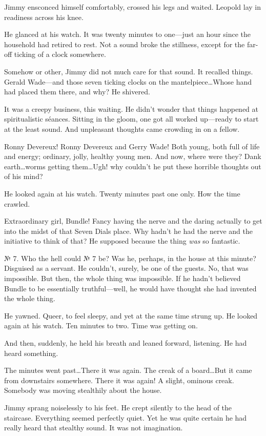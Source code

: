 Jimmy ensconced himself comfortably, crossed his legs and waited. Leopold lay in readiness across his knee.

He glanced at his watch. It was twenty minutes to one—just an hour since the household had retired to rest. Not a sound broke the stillness, except for the far-off ticking of a clock somewhere.

Somehow or other, Jimmy did not much care for that sound. It recalled things. Gerald Wade—and those seven ticking clocks on the mantelpiece\dots Whose hand had placed them there, and why? He shivered.

It was a creepy business, this waiting. He didn't wonder that things happened at spiritualistic séances. Sitting in the gloom, one got all worked up—ready to start at the least sound. And unpleasant thoughts came crowding in on a fellow.

Ronny Devereux! Ronny Devereux and Gerry Wade! Both young, both full of life and energy; ordinary, jolly, healthy young men. And now, where were they? Dank earth\dots worms getting them\dots Ugh! why couldn't he put these horrible thoughts out of his mind?

He looked again at his watch. Twenty minutes past one only. How the time crawled.

Extraordinary girl, Bundle! Fancy having the nerve and the daring actually to get into the midst of that Seven Dials place. Why hadn't he had the nerve and the initiative to think of that? He supposed because the thing \emph{was} so fantastic.

№ 7. Who the hell could № 7 be? Was he, perhaps, in the house at this minute? Disguised as a servant. He couldn't, surely, be one of the guests. No, that was impossible. But then, the whole thing was impossible. If he hadn't believed Bundle to be essentially truthful—well, he would have thought she had invented the whole thing.

He yawned. Queer, to feel sleepy, and yet at the same time strung up. He looked again at his watch. Ten minutes to two. Time was getting on.

And then, suddenly, he held his breath and leaned forward, listening. He had heard something.

The minutes went past\dots There it was again. The creak of a board\dots But it came from downstairs somewhere. There it was again! A slight, ominous creak. Somebody was moving stealthily about the house.

Jimmy sprang noiselessly to his feet. He crept silently to the head of the staircase. Everything seemed perfectly quiet. Yet he was quite certain he had really heard that stealthy sound. It was not imagination.

